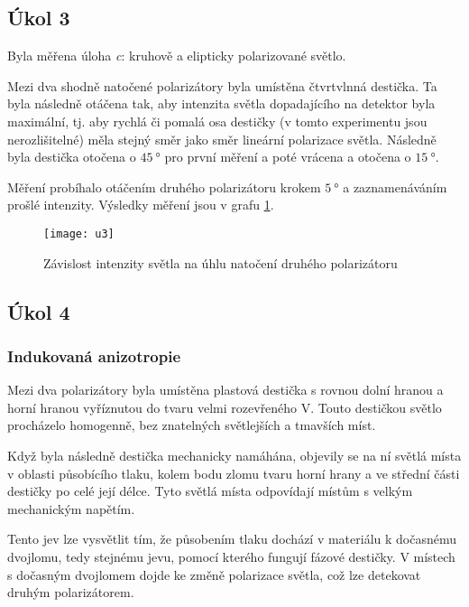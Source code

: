 \documentclass{protokol}
\begin{document}
    \subsection*{Úkol 3}

      Byla měřena úloha \textit{c}: kruhově a elipticky polarizované světlo. 

      Mezi dva shodně natočené polarizátory byla umístěna čtvrtvlnná destička. Ta byla následně otáčena tak, aby intenzita světla dopadajícího na detektor byla maximální, tj. aby rychlá či pomalá osa destičky (v tomto experimentu jsou nerozlišitelné) měla stejný směr jako směr lineární polarizace světla. Následně byla destička otočena o $\SI{45}{\degree}$ pro první měření a poté vrácena a otočena o $\SI{15}{\degree}$.

      Měření probíhalo otáčením druhého polarizátoru krokem $\SI{5}{\degree}$ a zaznamenáváním prošlé intenzity. Výsledky měření jsou v grafu \ref{fig:u3}. 

      \begin{figure}[H]
        \centering
        \texttt{[image: u3]}
        \caption{Závislost intenzity světla na úhlu natočení druhého polarizátoru}
        \label{fig:u3}
      \end{figure}

    \subsection*{Úkol 4}

      \subsubsection*{Indukovaná anizotropie}

        Mezi dva polarizátory byla umístěna plastová destička s rovnou dolní hranou a horní hranou vyříznutou do tvaru velmi rozevřeného V. Touto destičkou světlo procházelo homogenně, bez znatelných světlejších a tmavších míst.

        Když byla následně destička mechanicky namáhána, objevily se na ní světlá místa v oblasti působícího tlaku, kolem bodu zlomu tvaru horní hrany a ve střední části destičky po celé její délce. Tyto světlá místa odpovídají místům s velkým mechanickým napětím.

        Tento jev lze vysvětlit tím, že působením tlaku dochází v materiálu k dočasnému dvojlomu, tedy stejnému jevu, pomocí kterého fungují fázové destičky.
        V místech s dočasným dvojlomem dojde ke změně polarizace světla, což lze detekovat druhým polarizátorem.
 
\end{document}
